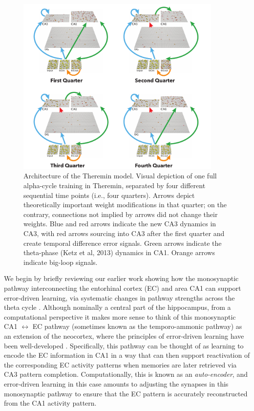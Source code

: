 \documentclass[11pt,twoside]{article}
\newif\myifpdf
\begin{document}
\begin{figure}
  \centering\includegraphics[width=4in]{fig_hip_edl_model}
  \caption{\footnotesize Architecture of the Theremin model. Visual depiction of one full alpha-cycle training in Theremin, separated by four different sequential time points (i.e., four quarters). Arrows depict theoretically important weight modifications in that quarter; on the contrary, connections not implied by arrows did not change their weights. Blue and red arrows indicate the new CA3 dynamics in CA3, with red arrows sourcing into CA3 after the first quarter and create temporal difference error signals. Green arrows indicate the theta-phase (Ketz et al, 2013) dynamics in CA1. Orange arrows indicate big-loop signals.}
\label{fig.theremin}
\end{figure}

We begin by briefly reviewing our earlier work showing how the monosynaptic pathway interconnecting the entorhinal cortex (EC) and area CA1 can support error-driven learning, via systematic changes in pathway strengths across the theta cycle \citep{KetzMorkondaOReilly13,HasselmoBodelonWyble02}.  Although nominally a central part of the hippocampus, from a computational perspective it makes more sense to think of this monosynaptic CA1 $\leftrightarrow$ EC pathway (sometimes known as the temporo-ammonic pathway) as an extension of the neocortex, where the principles of error-driven learning have been well-developed \citep{OReilly96,WhittingtonBogacz19}.  Specifically, this pathway can be thought of as learning to encode the EC information in CA1 in a way that can then support reactivation of the corresponding EC activity patterns when memories are later retrieved via CA3 pattern completion.  Computationally, this is known as an \emph{auto-encoder}, and error-driven learning in this case amounts to adjusting the synapses in this monosynaptic pathway to ensure that the EC pattern is accurately reconstructed from the CA1 activity pattern.
\end{document}
